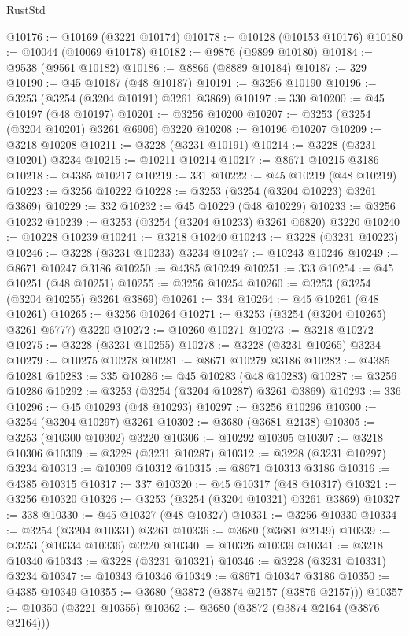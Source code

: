 \begin{lexlean}{RustStd}
\begin{coremodule}
@10176 := @10169 (@3221 @10174)
@10178 := @10128 (@10153 @10176)
@10180 := @10044 (@10069 @10178)
@10182 := @9876 (@9899 @10180)
@10184 := @9538 (@9561 @10182)
@10186 := @8866 (@8889 @10184)
@10187 := 329
@10190 := @45 @10187 (@48 @10187)
@10191 := @3256 @10190
@10196 := @3253 (@3254 (@3204 @10191) @3261 @3869)
@10197 := 330
@10200 := @45 @10197 (@48 @10197)
@10201 := @3256 @10200
@10207 := @3253 (@3254 (@3204 @10201) @3261 @6906) @3220
@10208 := @10196 @10207
@10209 := @3218 @10208
@10211 := @3228 (@3231 @10191)
@10214 := @3228 (@3231 @10201) @3234
@10215 := @10211 @10214
@10217 := @8671 @10215 @3186
@10218 := @4385 @10217
@10219 := 331
@10222 := @45 @10219 (@48 @10219)
@10223 := @3256 @10222
@10228 := @3253 (@3254 (@3204 @10223) @3261 @3869)
@10229 := 332
@10232 := @45 @10229 (@48 @10229)
@10233 := @3256 @10232
@10239 := @3253 (@3254 (@3204 @10233) @3261 @6820) @3220
@10240 := @10228 @10239
@10241 := @3218 @10240
@10243 := @3228 (@3231 @10223)
@10246 := @3228 (@3231 @10233) @3234
@10247 := @10243 @10246
@10249 := @8671 @10247 @3186
@10250 := @4385 @10249
@10251 := 333
@10254 := @45 @10251 (@48 @10251)
@10255 := @3256 @10254
@10260 := @3253 (@3254 (@3204 @10255) @3261 @3869)
@10261 := 334
@10264 := @45 @10261 (@48 @10261)
@10265 := @3256 @10264
@10271 := @3253 (@3254 (@3204 @10265) @3261 @6777) @3220
@10272 := @10260 @10271
@10273 := @3218 @10272
@10275 := @3228 (@3231 @10255)
@10278 := @3228 (@3231 @10265) @3234
@10279 := @10275 @10278
@10281 := @8671 @10279 @3186
@10282 := @4385 @10281
@10283 := 335
@10286 := @45 @10283 (@48 @10283)
@10287 := @3256 @10286
@10292 := @3253 (@3254 (@3204 @10287) @3261 @3869)
@10293 := 336
@10296 := @45 @10293 (@48 @10293)
@10297 := @3256 @10296
@10300 := @3254 (@3204 @10297) @3261
@10302 := @3680 (@3681 @2138)
@10305 := @3253 (@10300 @10302) @3220
@10306 := @10292 @10305
@10307 := @3218 @10306
@10309 := @3228 (@3231 @10287)
@10312 := @3228 (@3231 @10297) @3234
@10313 := @10309 @10312
@10315 := @8671 @10313 @3186
@10316 := @4385 @10315
@10317 := 337
@10320 := @45 @10317 (@48 @10317)
@10321 := @3256 @10320
@10326 := @3253 (@3254 (@3204 @10321) @3261 @3869)
@10327 := 338
@10330 := @45 @10327 (@48 @10327)
@10331 := @3256 @10330
@10334 := @3254 (@3204 @10331) @3261
@10336 := @3680 (@3681 @2149)
@10339 := @3253 (@10334 @10336) @3220
@10340 := @10326 @10339
@10341 := @3218 @10340
@10343 := @3228 (@3231 @10321)
@10346 := @3228 (@3231 @10331) @3234
@10347 := @10343 @10346
@10349 := @8671 @10347 @3186
@10350 := @4385 @10349
@10355 := @3680 (@3872 (@3874 @2157 (@3876 @2157)))
@10357 := @10350 (@3221 @10355)
@10362 := @3680 (@3872 (@3874 @2164 (@3876 @2164)))

\end{coremodule}
\end{lexlean}
